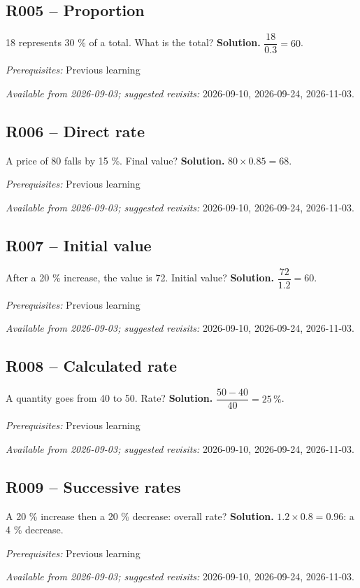 \subsection*{R005 -- Proportion}\label{R005}
18 represents 30 \% of a total. What is the total?
\ifprof\textbf{Solution.} $\dfrac{18}{0.3}=60$.\par\textit{Prerequisites:} Previous learning\par\textit{Available from 2026-09-03; suggested revisits:} 2026-09-10, 2026-09-24, 2026-11-03.\fi
{}\subsection*{R006 -- Direct rate}\label{R006}
A price of 80 falls by 15 \%. Final value?
\ifprof\textbf{Solution.} $80\times0.85=68$.\par\textit{Prerequisites:} Previous learning\par\textit{Available from 2026-09-03; suggested revisits:} 2026-09-10, 2026-09-24, 2026-11-03.\fi
{}\subsection*{R007 -- Initial value}\label{R007}
After a 20 \% increase, the value is 72. Initial value?
\ifprof\textbf{Solution.} $\dfrac{72}{1.2}=60$.\par\textit{Prerequisites:} Previous learning\par\textit{Available from 2026-09-03; suggested revisits:} 2026-09-10, 2026-09-24, 2026-11-03.\fi
{}\subsection*{R008 -- Calculated rate}\label{R008}
A quantity goes from 40 to 50. Rate?
\ifprof\textbf{Solution.} $\dfrac{50-40}{40}=25\,\%$.\par\textit{Prerequisites:} Previous learning\par\textit{Available from 2026-09-03; suggested revisits:} 2026-09-10, 2026-09-24, 2026-11-03.\fi
{}\subsection*{R009 -- Successive rates}\label{R009}
A 20 \% increase then a 20 \% decrease: overall rate?
\ifprof\textbf{Solution.} $1.2\times0.8=0.96$: a 4 \% decrease.\par\textit{Prerequisites:} Previous learning\par\textit{Available from 2026-09-03; suggested revisits:} 2026-09-10, 2026-09-24, 2026-11-03.\fi
